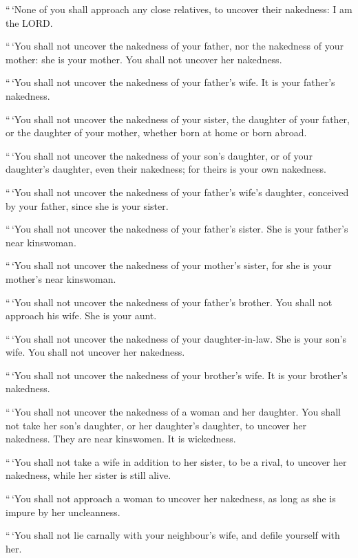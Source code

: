  ``\,`None of you shall approach any close relatives, to
uncover their nakedness: I am the LORD.

 ``\,`You shall not uncover the nakedness of your father,
nor the nakedness of your mother: she is your mother. You shall not
uncover her nakedness.

 ``\,`You shall not uncover the nakedness of your father's
wife. It is your father's nakedness.

 ``\,`You shall not uncover the nakedness of your sister,
the daughter of your father, or the daughter of your mother, whether
born at home or born abroad.

 ``\,`You shall not uncover the nakedness of your son's
daughter, or of your daughter's daughter, even their nakedness; for
theirs is your own nakedness.

 ``\,`You shall not uncover the nakedness of your father's
wife's daughter, conceived by your father, since she is your sister.

 ``\,`You shall not uncover the nakedness of your father's
sister. She is your father's near kinswoman.

 ``\,`You shall not uncover the nakedness of your mother's
sister, for she is your mother's near kinswoman.

 ``\,`You shall not uncover the nakedness of your father's
brother. You shall not approach his wife. She is your aunt.

 ``\,`You shall not uncover the nakedness of your
daughter-in-law. She is your son's wife. You shall not uncover her
nakedness.

 ``\,`You shall not uncover the nakedness of your brother's
wife. It is your brother's nakedness.

 ``\,`You shall not uncover the nakedness of a woman and
her daughter. You shall not take her son's daughter, or her daughter's
daughter, to uncover her nakedness. They are near kinswomen. It is
wickedness.

 ``\,`You shall not take a wife in addition to her sister,
to be a rival, to uncover her nakedness, while her sister is still
alive.

 ``\,`You shall not approach a woman to uncover her
nakedness, as long as she is impure by her uncleanness.

 ``\,`You shall not lie carnally with your neighbour's
wife, and defile yourself with her.

